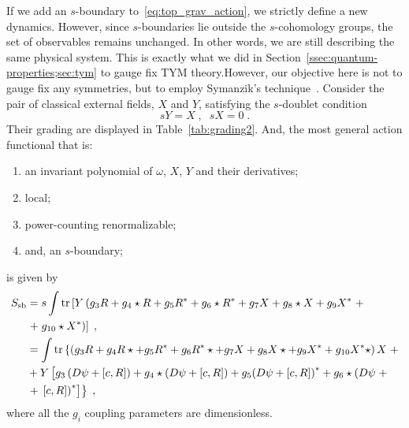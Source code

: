 \documentclass[../main.tex]{subfiles}
\begin{document}
If we add an $s$-boundary to~\eqref{eq:top_grav_action}, we strictly define a new dynamics. However, since $s$-boundaries lie outside the $s$-cohomology groups, the set of observables remains unchanged. In other words, we are still describing the same physical system. This is exactly what we did in Section~\ref{ssec:quantum-properties;sec:tym} to gauge fix TYM theory.\@ However, our objective here is not to gauge fix any symmetries, but to employ Symanzik's technique~\cite{symanzik1970a}. Consider the pair of classical external fields, $X$ and $Y$, satisfying the $s$-doublet condition
\begin{equation}
  \label{eq:s-doublet}
  sY = X \;, \;\; sX = 0 \;.
\end{equation}
Their grading are displayed in Table~\ref{tab:grading2}. And, the most general action functional that is:
\begin{enumerate}[label=\roman*)] %
  \item an invariant polynomial of $\omega$, $X$, $Y$ and their derivatives;
  \item local;
  \item power-counting renormalizable;
  \item  and, an $s$-boundary;
\end{enumerate}
is given by
\begin{subequations}%
  \label{eq:s-boundary_action}
  \begin{align}
    S_{\text{sb}} & = s \int \tr \left[ Y \left( g_3 R + g_4 \star R + g_5 R^* + g_6 \star R^* + g_7 X + g_8 \star X + g_9 X^* \right. + \right.                                                                \nonumber                                               \\
                  & \left. + \left. g_{10} \star X^* \right) \right] \;,                                                                                                                                                                                                \\
                  & = \int \tr \left\{ \left( g_3 R + g_4 R \star + g_5 R^* + g_6 R^* \star + g_7 X + g_8 X \star + g_9 X^* + g_{10} X^* \star \right) X \right. +                                                       \nonumber                                      \\
                  & + Y \left[ g_3 \left( D \psi + \left[ c , R \right] \right) + g_4 \star \left( D \psi + \left[ c , R \right] \right) + g_5 {\left( D \psi + \left[ c , R \right] \right)}^* + g_6 \star \left( D \psi \right. + \right.                   \nonumber \\
                  & \left. + \left. { \left. \left[ c , R \right] \right) }^* \right] \right\} \;,                                                                                                                                                                      %
  \end{align}
\end{subequations}
where all the $g_i$ coupling parameters are dimensionless.
\end{document}
